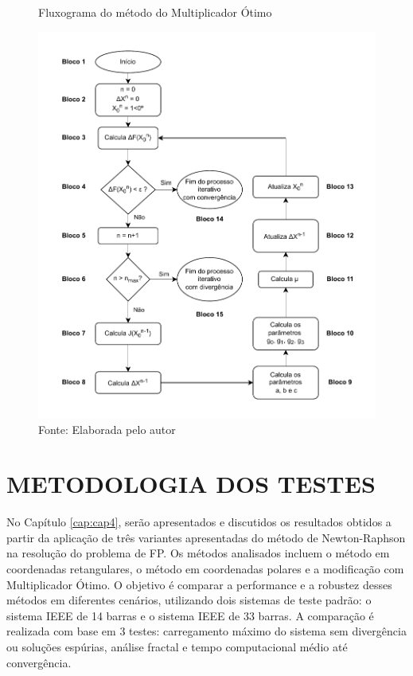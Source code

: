 \begin{figure}[H]
    \caption{Fluxograma do método do Multiplicador Ótimo}
    \centering
    \includegraphics[scale=0.90]{textuais/capitulo3/figuras/Diagrama_NR_OM_5.drawio.pdf}
    \caption*{Fonte: Elaborada pelo autor}
    \label{fig:diagrama_FPOM}
\end{figure}


\section{METODOLOGIA DOS TESTES}
No Capítulo \ref{cap:cap4}, serão apresentados e discutidos os resultados obtidos a partir da aplicação de três variantes apresentadas do método de Newton-Raphson na resolução do problema de \ac{FP}. Os métodos analisados incluem o método em coordenadas retangulares, o método em coordenadas polares e a modificação com Multiplicador Ótimo. O objetivo é comparar a performance e a robustez desses métodos em diferentes cenários, utilizando dois sistemas de teste padrão: o sistema \acs{IEEE} de 14 barras e o sistema \acs{IEEE} de 33 barras. A comparação é realizada com base em 3 testes: carregamento máximo do sistema sem divergência ou soluções espúrias, análise fractal e tempo computacional médio até convergência. 

